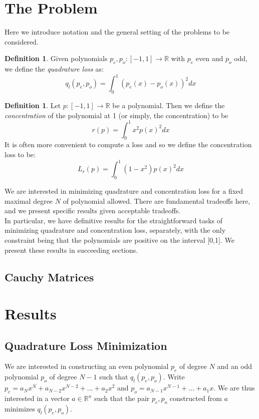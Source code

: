 \documentclass[final,3p]{CSP}
\theoremstyle{definition}
\newtheorem{defn}[thm]{Definition}
\theoremstyle{remark}
\numberwithin{equation}{section}
\begin{document}
\section{The Problem}
\noindent
Here we introduce notation and the general setting of the problems to be considered.

\begin{defn}
Given polynomials $p_e, p_o : [-1,1] \to \mathbb{R}$ with $p_e$ even and $p_o$ odd, we define the \emph{quadrature loss} as: 
\[q_l(p_e,p_o) = \int_0^1 (p_e(x) - p_o(x))^2 dx\]
\end{defn}

\begin{defn} Let $p:[-1,1] \to \mathbb{R}$ be a polynomial. Then we define the \emph{concentration}
 of the polynomial at 1 (or simply, the concentration) to be 
 \[r(p) = \int_0^1 x^2p(x)^2dx \]
 It is often more convenient to compute a loss and so we define the concentration loss to be: 
 \[L_r(p) = \int_0^1 (1-x^2)p(x)^2dx\]
 \end{defn}
 
 We are interested in minimizing quadrature and concentration loss for a fixed maximal degree $N$ of polynomial allowed. There are fundamental tradeoffs here, and we present specific results given acceptable tradeoffs. \\
 
 In particular, we have definitive results for the straightforward tasks of minimizing quadrature and concentration loss, separately, with the only constraint being that the polynomials are positive on the interval [0,1]. We present these results in succeeding sections. 
\subsection{Cauchy Matrices}

\section{Results}

\subsection{Quadrature Loss Minimization}
We are interested in constructing an even polynomial $p_e$ of degree $N$ and an odd polynomial $p_o$ of degree $N-1$ such that $q_l(p_e,p_o)$. Write $p_e = a_N x^N + a_{N-2} x^{N-2} + ... + a_2x^2$ and $p_o = a_{N-1}x^{N-1} + ... + a_1x$. We are thus interested in a vector $a\in\mathbb{R}^n$ such that the pair $p_e, p_o$ constructed from $a$ minimizes $q_l(p_e,p_o)$. 
\end{document}
